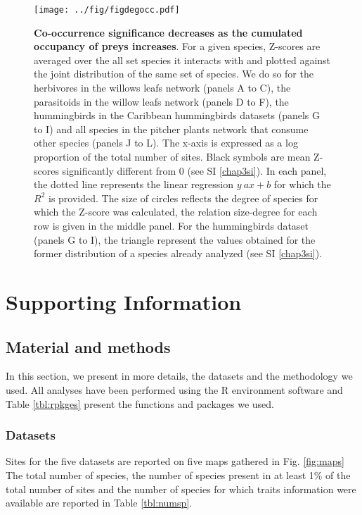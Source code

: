 \newpage

\begin{figure}
\centering
\texttt{[image: ../fig/figdegocc.pdf]}
\caption{\textbf{Co-occurrence significance decreases as the cumulated
occupancy of preys increases}. For a given species, Z-scores are
averaged over the all set species it interacts with and plotted against
the joint distribution of the same set of species. We do so for the
herbivores in the willows leafs network (panels A to C), the parasitoids
in the willow leafs network (panels D to F), the hummingbirds in the
Caribbean hummingbirds datasets (panels G to I) and all species in the
pitcher plants network that consume other species (panels J to L). The
x-axis is expressed as a log proportion of the total number of sites.
Black symbols are mean Z-scores significantly different from 0 (see SI
\ref{chap3si}). In each panel, the dotted line represents the linear
regression \(y~ax+b\) for which the \(R^2\) is provided. The size of
circles reflects the degree of species for which the Z-score was
calculated, the relation size-degree for each row is given in the middle
panel. For the hummingbirds dataset (panels G to I), the triangle
represent the values obtained for the former distribution of a species
already analyzed (see SI \ref{chap3si}).\label{fig:degocc}}
\end{figure}

\newpage

\section{Supporting Information}\label{supporting-information}

\label{chap3si}

\subsection{Material and methods}\label{material-and-methods-1}

In this section, we present in more details, the datasets and the
methodology we used. All analyses have been performed using the R
environment software and Table \ref{tbl:rpkges} present the functions
and packages we used.

\subsubsection{Datasets}\label{datasets-1}

Sites for the five datasets are reported on five maps gathered in Fig.
\ref{fig:maps} The total number of species, the number of species
present in at least 1\% of the total number of sites and the number of
species for which traits information were available are reported in
Table \ref{tbl:numsp}.

